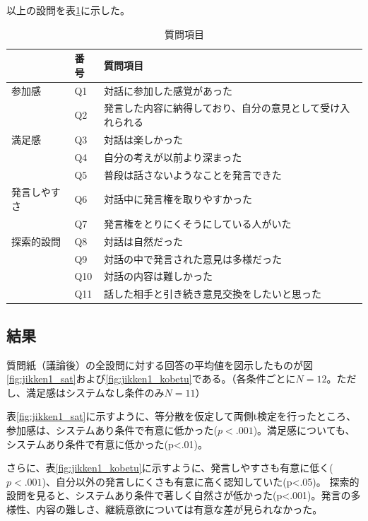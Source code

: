 \documentclass[11pt, a4paper]{jreport} %
\begin{document}
以上の設問を表\ref{tab:shitumon1}に示した。
\begin{table}[H]
\caption{質問項目}
\label{tab:shitumon1}
\begin{tabular}{@{}lll@{}}
\toprule
\multicolumn{1}{c}{} & 番号 & 質問項目                          \\ \midrule
参加感                  & Q1   & 対話に参加した感覚があった                 \\
                     & Q2   & 発言した内容に納得しており、自分の意見として受け入れられる \\
満足感                  & Q3   & 対話は楽しかった                      \\
                     & Q4   & 自分の考えが以前より深まった                \\
                     & Q5   & 普段は話さないようなことを発言できた            \\
発言しやすさ               & Q6   & 対話中に発言権を取りやすかった               \\
                     & Q7   & 発言権をとりにくそうにしている人がいた           \\
探索的設問                & Q8   & 対話は自然だった                      \\
                     & Q9   & 対話の中で発言された意見は多様だった            \\
                     & Q10  & 対話の内容は難しかった                   \\
                     & Q11  & 話した相手と引き続き意見交換をしたいと思った        \\ \bottomrule
\end{tabular}
\end{table}


\subsection{結果}
質問紙（議論後）の全設問に対する回答の平均値を図示したものが図\ref{fig:jikken1_sat}および\ref{fig:jikken1_kobetu}である。（各条件ごとに$N=12$。ただし、満足感はシステムなし条件のみ$N=11$）


表\ref{fig:jikken1_sat}に示すように、等分散を仮定して両側t検定を行ったところ、参加感は、システムあり条件で有意に低かった($p<.001$)。満足感についても、システムあり条件で有意に低かった(p<.01)。


さらに、表\ref{fig:jikken1_kobetu}に示すように、発言しやすさも有意に低く($p<.001$)、自分以外の発言しにくさも有意に高く認知していた(p<.05)。
探索的設問を見ると、システムあり条件で著しく自然さが低かった(p<.001)。発言の多様性、内容の難しさ、継続意欲については有意な差が見られなかった。
\end{document}
